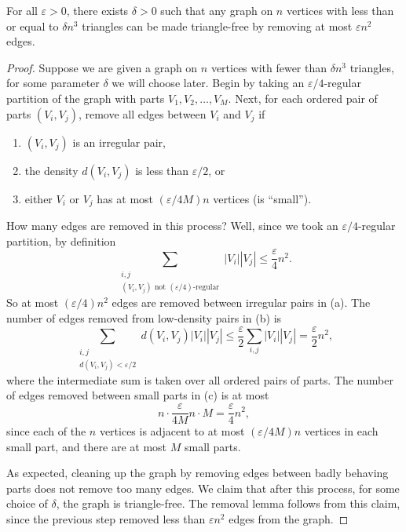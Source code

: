 \begin{theorem}
For all $\varepsilon>0$, there exists $\delta>0$ such that any graph on $n$ vertices with less than or equal to $\delta n^3$ triangles can be made triangle-free by removing at most $\varepsilon n^2$ edges.
\end{theorem}
\begin{proof}
Suppose we are given a graph on $n$ vertices with fewer than $\delta n^3$ triangles, for some parameter $\delta$ we will choose later. Begin by taking an $\varepsilon/4$-regular partition of the graph with parts $V_1,V_2,\ldots,V_M$. Next, for each ordered pair of parts $(V_i,V_j)$, remove all edges between $V_i$ and $V_j$ if
\begin{enumerate}[label=(\alph*)]
\item $(V_i,V_j)$ is an irregular pair,
\item the density $d(V_i,V_j)$ is less than $\varepsilon/2$, or
\item either $V_i$ or $V_j$ has at most $(\varepsilon/4M)n$ vertices (is ``small'').
\end{enumerate}
How many edges are removed in this process? Well, since we took an $\varepsilon/4$-regular partition, by definition
\[\sum_{\substack{i,j\\(V_i,V_j)\text{ not }(\varepsilon/4)\text{-regular}}}|V_i||V_j|\leq\frac{\varepsilon}{4}n^2.\]
So at most $(\varepsilon/4)n^2$ edges are removed between irregular pairs in (a). The number of edges removed from low-density pairs in (b) is
\[\sum_{\substack{i,j\\d(V_i,V_j)<\varepsilon/2}}d(V_i,V_j)|V_i||V_j|
\leq\frac{\varepsilon}{2}\sum_{i,j}|V_i||V_j|=\frac{\varepsilon}{2}n^2,\]
where the intermediate sum is taken over all ordered pairs of parts. The number of edges removed between small parts in (c) is at most
\[n\cdot\frac{\varepsilon}{4M}n\cdot M=\frac{\varepsilon}{4}n^2,\]
since each of the $n$ vertices is adjacent to at most $(\varepsilon/4M)n$ vertices in each small part, and there are at most $M$ small parts.

As expected, cleaning up the graph by removing edges between badly behaving parts does not remove too many edges. We claim that after this process, for some choice of $\delta$, the graph is triangle-free. The removal lemma follows from this claim, since the previous step removed less than $\varepsilon n^2$ edges from the graph.


\end{proof}
